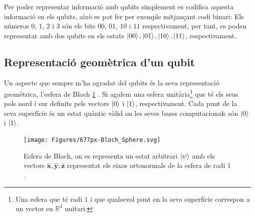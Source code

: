 Per poder representar informació amb qubits simplement es codifica aquesta informació en els qubits, això es pot fer per exemple mitjançant codi binari: Els números $0$, $1$, $2$ i $3$ són els bits $00$, $01$, $10$ i $11$ respectivament, per tant, es poden representar amb dos qubits en els estats $\ket{00}, \ket{01}, \ket{10}, \ket{11}$, respectivament.

\subsection{Representació geomètrica d'un qubit}
Un aspecte que sempre m'ha agradat del qubits és la seva representació geomètrica, l'esfera de Bloch \ref{fig:677px-blochsphere} \cite{QCandQI:bloch}. Si agafem una esfera unitària\footnote{Una esfera que té radi $1$ i que qualsevol punt en la seva superfície correspon a un vector en $\mathbb{R}^3$ unitari. } que té els seus pols nord i sur definits pels vectors $\ket{0}$ i $\ket{1}$, respectivament. Cada punt de la seva superfície és un estat quàntic vàlid on les seves bases computacionals són $\ket{0}$ i $\ket{1}$.
\begin{figure}
	\centering
	\texttt{[image: Figures/677px-Bloch\_Sphere.svg]}
	\caption{Esfera de Bloch, on es representa un estat arbitrari $\ket{\psi}$ amb els vectors $\hat{\mathbf{x}}, \hat{\mathbf{y}}, \hat{\mathbf{z}}$ representat els eixos ortonormals de la esfera de radi $1$.}
	\label{fig:677px-blochsphere}
\end{figure}

